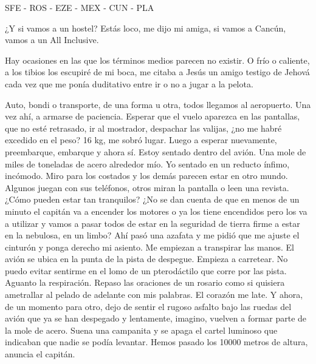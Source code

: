 \documentclass[11pt,twoside,openright,a6paper]{book}
\begin{document}
\vspace{0.5cm}
\hrulefill\hspace{0.2cm} \decofourleft\decofourright \hspace{0.2cm} \hrulefill
\vspace{0.5cm}

SFE - ROS - EZE - MEX - CUN - PLA


\vspace{0.5cm}
\hrulefill\hspace{0.2cm} \decofourleft\decofourright \hspace{0.2cm} \hrulefill
\vspace{0.5cm}

¿Y si vamos a un hostel? Estás loco, me dijo mi amiga, si vamos a Cancún,
vamos a un All Inclusive.

Hay ocasiones en las que los términos medios parecen no existir. O frío
o caliente, a los tibios los escupiré de mi boca, me citaba a Jesús un
amigo testigo de Jehová cada vez que me ponía duditativo entre ir o no
a jugar a la pelota.


\vspace{0.5cm}
\hrulefill\hspace{0.2cm} \decofourleft\decofourright \hspace{0.2cm} \hrulefill
\vspace{0.5cm}

Auto, bondi o transporte, de una forma u otra, todos llegamos al
aeropuerto. Una vez ahí, a armarse de paciencia. Esperar que el vuelo
aparezca en las pantallas, que no esté retrasado, ir al mostrador,
despachar las valijas, ¿no me habré excedido en el peso? 16 kg, me sobró
lugar. Luego a esperar nuevamente, preembarque, embarque y ahora sí. Estoy
sentado dentro del avión. Una mole de miles de toneladas de acero alrededor
mío. Yo sentado en un reducto ínfimo, incómodo. Miro para los costados y
los demás parecen estar en otro mundo. Algunos juegan con sus teléfonos,
otros miran la pantalla o leen una revista. ¿Cómo pueden estar tan
tranquilos? ¿No se dan cuenta de que en menos de un minuto el capitán va
a encender los motores o ya los tiene encendidos pero los va a utilizar y
vamos a pasar todos de estar en la seguridad de tierra firme a estar en la
nebulosa, en un limbo? Ahí pasó una azafata y me pidió que me ajuste el
cinturón y ponga derecho mi asiento. Me empiezan a transpirar las manos. El
avión se ubica en la punta de la pista de despegue. Empieza a carretear. No
puedo evitar sentirme en el lomo de un pterodáctilo que corre por las
pista. Aguanto la respiración. Repaso las oraciones de un rosario como si
quisiera ametrallar al pelado de adelante con mis palabras. El corazón me
late. Y ahora, de un momento para otro, dejo de sentir el rugoso asfalto
bajo las ruedas del avión que ya se han despegado y lentamente, imagino,
vuelven a formar parte de la mole de acero. Suena una campanita y se apaga
el cartel luminoso que indicaban que nadie se podía levantar. Hemos pasado
los 10000 metros de altura, anuncia el capitán.
\end{document}
